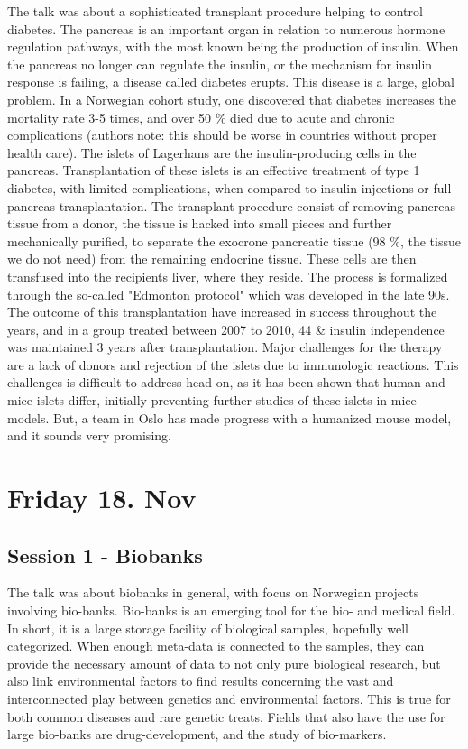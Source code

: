 \documentclass[12p]{article}
\begin{document}
The talk was about a sophisticated transplant procedure helping to control diabetes.
The pancreas is an important organ in relation to numerous hormone regulation pathways, with the most known being the production of insulin.
When the pancreas no longer can regulate the insulin, or the mechanism for insulin response is failing, a disease called diabetes erupts.
This disease is a large, global problem.
In a Norwegian cohort study, one discovered that diabetes increases the mortality rate 3-5 times, and over 50 \% died due to acute and chronic complications (authors note: this should be worse in countries without proper health care).
The islets of Lagerhans are the insulin-producing cells in the pancreas.
Transplantation of these islets is an effective treatment of type 1 diabetes, with limited complications, when compared to insulin injections or full pancreas transplantation.
The transplant procedure consist of removing pancreas tissue from a donor, the tissue is hacked into small pieces and further mechanically purified, to separate the exocrone pancreatic tissue (98 \%, the tissue we do not need) from the remaining endocrine tissue.
These cells are then transfused into the recipients liver, where they reside.
The process is formalized through the so-called "Edmonton protocol" which was developed in the late 90s.
The outcome of this transplantation have increased in success throughout the years, and in a group treated between 2007 to 2010, 44 \& insulin independence was maintained 3 years after transplantation.
Major challenges for the therapy are a lack of donors and rejection of the islets due to immunologic reactions.
This challenges is difficult to address head on, as it has been shown that human and mice islets differ, initially preventing further studies of these islets in mice models.
But, a team in Oslo has made progress with a humanized mouse model, and it sounds very promising. 


\section*{Friday 18. Nov}

\subsection*{Session 1 - Biobanks}

The talk was about biobanks in general, with focus on Norwegian projects involving bio-banks.
Bio-banks is an emerging tool for the bio- and medical field.
In short, it is a large storage facility of biological samples, hopefully well categorized.
When enough meta-data is connected to the samples, they can provide the necessary amount of data to not only pure biological research, but also link environmental factors to find results concerning the vast and interconnected play between genetics and environmental factors.
This is true for both common diseases and rare genetic treats.
Fields that also have the use for large bio-banks are drug-development, and the study of bio-markers.
\end{document}
